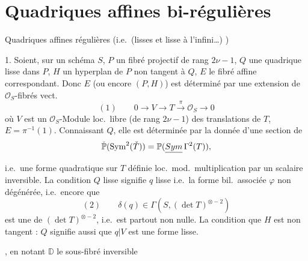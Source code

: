 \documentclass[11pt,a4paper]{article}
\begin{document}
\section*{Quadriques affines bi-régulières}

 Quadriques affines régulières (i.e.\ (lisses et lisse à l'infini…) )

1. Soient, sur un schéma $S$, $P$ un fibré projectif de rang $2\nu - 1$, $Q$ une quadrique lisse dans $P$, $H$ un hyperplan de $P$ non tangent à $Q$,  $E$ le fibré affine correspondant. Donc $E$ (ou encore $(P, H)$) est déterminé par une extension de $\mathcal{O}_{S}$-fibrés vect.
\[
  (1) \qquad 0 \longrightarrow V \longrightarrow T \xrightarrow{\ \pi\ } \mathcal{O}_{S} \longrightarrow 0
\]
où $V$ est un $\mathcal{O}_{S}$-Module loc.\ libre (de rang $2\nu - 1$)  des translations de $T$, $E = \pi^{-1}(1)$. Connaissant $Q$, elle est déterminée par la donnée d'une section de
\[
  \check{\mathbb{P}}(\mathrm{Sym}^{2}(\check{T})) = \mathbb{P}(\struck{Sym}\,\Gamma^{2}(T)),
\]
i.e.\ une forme quadratique  sur $T$ définie loc.\ mod.\ multiplication par un scalaire inversible. La condition $Q$ lisse signifie $q$ lisse i.e.\ la forme bil.\ associée $\varphi$ non dégénérée, i.e.\ encore que
\[
  (2) \qquad \delta(q) \in \Gamma(S, (\det T)^{\otimes -2})
\]
est une   de $(\det T)^{\otimes -2}$, i.e.\ est partout non nulle. La condition que $H$ est non tangent : $Q$ signifie aussi que $q \vert V$ est une forme lisse.  

, en notant $\mathbb{D}$ le sous-fibré inversible

\end{document}
